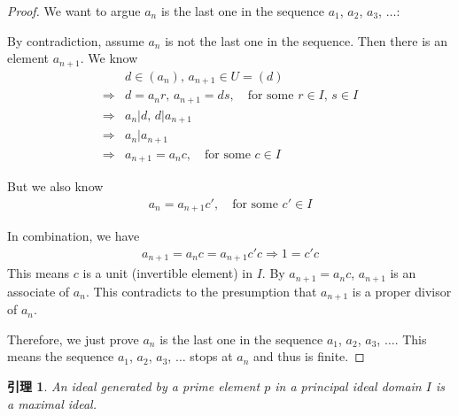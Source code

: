 \documentclass[utf8]{ctexbook}
\newtheorem{lemma}{引理}[section]
\begin{document}
\begin{proof}
We want to argue $a_n$ is the last one in the sequence $a_1$, $a_2$, $a_3$, $\ldots$: 

By contradiction, assume $a_n$ is not the last one in the sequence. Then there is an element $a_{n+1}$. We know
\begin{align*}
& d \in (a_n), \, a_{n+1} \in U = (d) \\
\Longrightarrow & d = a_n r, \,  a_{n+1} = d s, \quad \mbox{for some } r \in I, \, s \in I \\
\Longrightarrow & a_n | d, \, d | a_{n+1} \\
\Longrightarrow & a_n | a_{n+1} \\
\Longrightarrow & a_{n+1} = a_n c, \quad \mbox{for some } c \in I
\end{align*}

But we also know 
\begin{align*}
a_{n} = a_{n+1} c', \quad \mbox{for some } c' \in I
\end{align*}

In combination, we have
\begin{align*}
a_{n+1} = a_n c = a_{n+1} c' c \Longrightarrow 1 = c' c
\end{align*}
This means $c$ is a unit (invertible element) in $I$. By $a_{n+1} = a_n c$, $a_{n+1}$ is an associate of $a_n$. This contradicts to the presumption that $a_{n+1}$ is a proper divisor of $a_n$. 

Therefore, we just prove $a_n$ is the last one in the sequence $a_1$, $a_2$, $a_3$, $\ldots$. This means the sequence $a_1$, $a_2$, $a_3$, $\ldots$ stops at $a_n$ and thus is finite.

\end{proof}


\begin{lemma}
\label{lemma_principal_ideal_domain_UFD_2}
An ideal generated by a prime element $p$ in a principal ideal domain $I$ is a maximal ideal.
\end{lemma}
\end{document}
